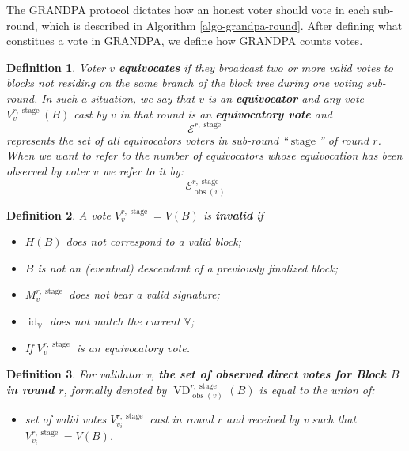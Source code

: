 \documentclass{book}
\newcommand{\nosymbol}{}
\newcommand{\tmop}[1]{\ensuremath{\operatorname{#1}}}
\newcommand{\tmstrong}[1]{\textbf{#1}}
\newcommand{\tmverbatim}[1]{{\ttfamily{#1}}}
\newenvironment{itemizedot}{\begin{itemize} \renewcommand{\labelitemi}{$\bullet$}\renewcommand{\labelitemii}{$\bullet$}\renewcommand{\labelitemiii}{$\bullet$}\renewcommand{\labelitemiv}{$\bullet$}}{\end{itemize}}
\newtheorem{definition}{Definition}
\newtheorem{definition}{Definition}
\begin{document}
The GRANDPA protocol dictates how an honest voter should vote in each
sub-round, which is described in Algorithm \ref{algo-grandpa-round}. After
defining what constitues a vote in GRANDPA, we define how GRANDPA counts
votes.

\begin{definition}
  Voter $v$ {\tmstrong{equivocates}} if they broadcast two or more valid votes
  to blocks not residing on the same branch of the block tree during one
  voting sub-round. In such a situation, we say that $v$ is an
  {\tmstrong{equivocator}} and any vote $V_v^{r, \tmop{stage}} (B)$ cast by
  $v$ in that round is an {\tmstrong{equivocatory vote}} and
  \[ \mathcal{E}^{r, \tmop{stage}} \]
  represents the set of all equivocators voters in sub-round
  ``$\tmop{stage}$'' of round $r$. When we want to refer to the number
  of\tmverbatim{} equivocators whose equivocation has been observed by voter
  $v$ we refer to it by:
  \[ \mathcal{E}^{r, \tmop{stage}}_{\tmop{obs} (v)} \]
  
\end{definition}

\begin{definition}
  A vote $V_v^{r, \tmop{stage}} = V (B)$ is {\tmstrong{invalid}} if
  \begin{itemize}
    \begin{itemizedot}
      \item $H (B)$ does not correspond to a valid block;
      
      \item $B$ is not an (eventual) descendant of a previously finalized
      block;
      
      \item $M^{r, \tmop{stage}}_v$ does not bear a valid signature;
      
      \item $\tmop{id}_{\mathbb{V}}$ does not match the current $\mathbb{V}$;
      
      \item If $V_v^{r, \tmop{stage}}$ is an equivocatory vote.
    \end{itemizedot}
  \end{itemize}
\end{definition}

\begin{definition}
  For validator v, {\tmstrong{the set of observed direct votes for Block $B$
  in round $r$}}, formally denoted by $\tmop{VD}^{r, \tmop{stage}}_{\tmop{obs}
  (v)}^{\nosymbol}_{\nosymbol} (B)$ is equal to the union of:
  \begin{itemizedot}
    \item set of valid votes $V^{r, \tmop{stage}}_{v_i}$ cast in round $r$ and
    received by v such that $V^{r, \tmop{stage}}_{v_i} = V (B)$.
  \end{itemizedot}
\end{definition}
\end{document}
